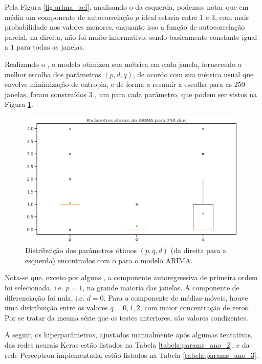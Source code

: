 Pela Figura \ref{fig:arima_acf}, analisando o  da esquerda, podemos notar que em média um componente de autocorrelação $p$ ideal estaria entre $1$ e $3$, com mais probabilidade nos valores menores, enquanto isso a função de autocorrelação parcial, na direita, não foi muito informativo, sendo basicamente constante igual a $1$ para todas as janelas.

Realizando o , o modelo otimizou sua métrica em cada janela, fornecendo a melhor escolha dos parâmetros $(p, d, q)$, de acordo com sua métrica usual que envolve minimização de entropia, e de forma a resumir a escolha para as $250$ janelas, foram construídos $3$ , um para cada parâmetro, que podem ser vistos na Figura \ref{fig:arima_boxplot}.

\begin{figure}[htb]
\centering
\includegraphics[width=11cm]{figuras/arima_boxplot}
\caption{Distribuição dos parâmetros ótimos $(p, q, d)$ (da direita para a esquerda) encontrados com o  para o modelo ARIMA.}
\label{fig:arima_boxplot}
\end{figure}

Nota-se que, exceto por alguns , a componente autoregressiva de primeira ordem foi selecionada, i.e. $p = 1$, na grande maioria das janelas. A componente de diferenciação foi nula, i.e. $d = 0$. Para a componente de médias-móveis, houve uma distribuição entre os valores $q = 0, 1, 2$, com maior concentração de zeros. Por se tratar da mesma série que os testes anteriores, são valores condizentes.

A seguir, os hiperparâmetros, ajustados manualmente após algumas tentativas, das redes neurais Keras estão listados na Tabela \ref{tabela:params_ano_2}, e da rede Perceptron implementada, estão listados na Tabela \ref{tabela:params_ano_3}.

